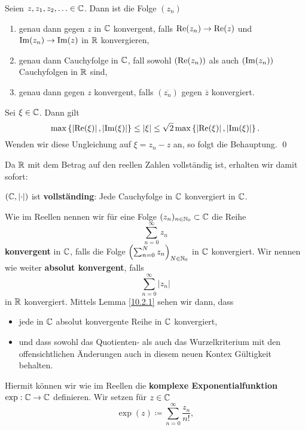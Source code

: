 \begin{sublemma}
	Seien $ z, z_1, z_2, \dotsc \in \mathbb{C}  $. Dann ist die Folge $ (z_n) $ 
	\begin{enumerate}[label=(\roman*)]
		\item genau dann gegen $ z $ in $ \mathbb{C}  $ konvergent, falls $ \operatorname{Re}(z_n) \to \operatorname{Re}(z) $ und $ \operatorname{Im}(z_n) \to \operatorname{Im}(z) $ in $ \mathbb{R}  $ konvergieren,
		\item genau dann Cauchyfolge in $ \mathbb{C}  $, fall sowohl $ (\operatorname{Re}(z_n)) $ als auch $ (\operatorname{Im}(z_n)) $ Cauchyfolgen in $ \mathbb{R}  $ sind,
		\item genau dann gegen $ z $ konvergent, falls $ (\overline{z_n} ) $ gegen $ \overline{z}  $ konvergiert.
	\end{enumerate}
\end{sublemma}
\begin{subproof*}
	Sei $ \xi \in \mathbb{C}  $. Dann gilt
	\[
		\max \left\{ \left| \operatorname{Re}(\xi) \right| , \left| \operatorname{Im}(\xi) \right| \right\} \leq \left| \xi \right| \leq \sqrt{2} \max \left\{ \left| \operatorname{Re}(\xi) \right| , \left| \operatorname{Im}(\xi) \right|  \right\} . 
	\]
	Wenden wir diese Ungleichung auf $ \xi = z_n - z $ an, so folgt die Behauptung. \qed
\end{subproof*}
Da $ \mathbb{R}  $ mit dem Betrag auf den reellen Zahlen vollständig ist, erhalten wir damit sofort:
\begin{subcorollary}
	$ (\mathbb{C} , \left| \cdot  \right| ) $ ist \textbf{vollständing}: Jede Cauchyfolge in $ \mathbb{C}  $ konvergiert in $ \mathbb{C}  $.
\end{subcorollary}
Wie im Reellen nennen wir für eine Folge $ (z_n)_{n \in \mathbb{N}_0} \subset \mathbb{C}  $ die Reihe
\[
	\sum_{n=0}^{\infty} z_n
\]
\textbf{konvergent} in $ \mathbb{C}  $, falls die Folge $ \left( \sum_{n=0}^{N} z_n \right)_{N \in \mathbb{N}_0}  $ in $ \mathbb{C}  $ konvergiert. Wir nennen wie weiter \textbf{absolut konvergent}, falls
\[
	\sum_{n=0}^{\infty} \left| z_n \right| 
\]
in $ \mathbb{R}  $ konvergiert. Mittels Lemma \ref{10.2.1} sehen wir dann, dass
\begin{itemize}
	\item jede in $ \mathbb{C}  $ absolut konvergente Reihe in $ \mathbb{C}  $ konvergiert,
	\item und dass sowohl das Quotienten- als auch das Wurzelkriterium mit den offensichtlichen Änderungen auch in diesem neuen Kontex Gültigkeit behalten.
\end{itemize}
Hiermit können wir wie im Reellen die \textbf{komplexe Exponentialfunktion} $ \exp : \mathbb{C} \to \mathbb{C}  $ definieren. Wir setzen für $ z \in \mathbb{C}  $ 
\[
	\exp (z) \coloneqq \sum_{n=0}^{\infty} \frac{ z_n }{ n! } ,
\]
